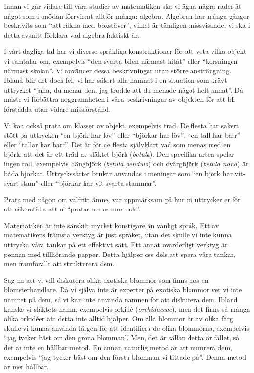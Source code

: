 Innan vi går vidare till våra studier av matematiken ska vi ägna några rader åt 
något som i onödan förrvirrat alltför många: algebra.
Algebran har många gånger beskrivits som \enquote{att räkna med bokstäver}, 
vilket är tämligen missvisande, vi ska i detta avsnitt förklara vad algebra 
faktiskt är.

I vårt dagliga tal har vi diverse språkliga konstruktioner för att veta vilka 
objekt vi samtalar om, exempelvis \enquote{den svarta bilen närmast hitåt} 
eller \enquote{korsningen närmast skolan}.
Vi använder dessa beskrivningar utan större ansträngning.
Ibland blir det dock fel, vi har säkert alla hamnat i en situation som krävt 
uttrycket \enquote{jaha, du menar den, jag trodde att du menade något helt 
annat}.
Då måste vi förbättra noggrannheten i våra beskrivningar av objekten för att 
bli förstådda utan vidare missförstånd.

Vi kan också prata om klasser av objekt, exempelvis träd.
De flesta har säkert stött på uttrycken \enquote{en björk har löv} eller 
\enquote{björkar har löv}, \enquote{en tall har barr} eller \enquote{tallar har 
barr}.
Det är för de flesta självklart vad som menas med en björk, att det är ett träd 
av släktet björk (\emph{betula}).
Den specifika arten spelar ingen roll, exempelvis hängbjörk (\emph{betula 
pendula}) och dvärgbjörk (\emph{betula nana}) är båda björkar.
Uttryckssättet brukar användas i meningar som \enquote{en björk har vit-svart 
stam} eller \enquote{björkar har vit-svarta stammar}.

\begin{exercise}
  Prata med någon om valfritt ämne, var uppmärksam på hur ni uttrycker er för 
  att säkerställa att ni \enquote{pratar om samma sak}.
\end{exercise}

Matematiken är inte särskilt mycket konstigare än vanligt språk.
Ett av matematikens främsta verktyg är just språket, utan det skulle vi inte 
kunna uttrycka våra tankar på ett effektivt sätt.
Ett annat ovärderligt verktyg är pennan med tillhörande papper.
Detta hjälper oss dels att spara våra tankar, men framförallt att strukturera 
dem.

Säg nu att vi vill diskutera olika exotiska blommor som finns hos en 
blomsterhandlare.
Då vi själva inte är experter på exotiska blommor vet vi inte namnet på dem, så 
vi kan inte använda namnen för att diskutera dem.
Ibland kanske vi släktets namn, exempelvis orkidé (\emph{orchidaceae}), men det 
finns så många olika orkidéer att detta inte alltid hjälper.
Om alla blommor är av olika färg skulle vi kunna använda färgen för att 
identifiera de olika blommorna, exempelvis \enquote{jag tycker bäst om den 
gröna blomman}.
Men, det är sällan detta är fallet, så det är inte en hållbar metod.
En annan naturlig metod är att numrera dem, exempelvis \enquote{jag tycker bäst 
om den första blomman vi tittade på}.
Denna metod är mer hållbar.

